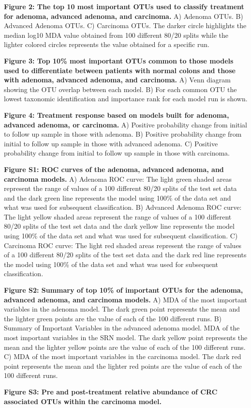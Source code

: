 \documentclass[12pt,]{article}
\begin{document}
\textbf{Figure 2: The top 10 most important OTUs used to classify
treatment for adenoma, advanced adenoma, and carcinoma.} A) Adenoma
OTUs. B) Advanced Adenoma OTUs. C) Carcinoma OTUs. The darker circle
highlights the median log10 MDA value obtained from 100 different 80/20
splits while the lighter colored circles represents the value obtained
for a specific run.

\textbf{Figure 3: Top 10\% most important OTUs common to those models
used to differentiate between patients with normal colons and those with
adenoma, advanced adenoma, and carcinoma.} A) Venn diagram showing the
OTU overlap between each model. B) For each common OTU the lowest
taxonomic identification and importance rank for each model run is
shown.

\textbf{Figure 4: Treatment response based on models built for adenoma,
advanced adenoma, or carcinoma.} A) Positive probability change from
initial to follow up sample in those with adenoma. B) Positive
probability change from initial to follow up sample in those with
advanced adenoma. C) Positive probability change from initial to follow
up sample in those with carcinoma.

\newpage

\textbf{Figure S1: ROC curves of the adenoma, advanced adenoma, and
carcinoma models.} A) Adenoma ROC curve: The light green shaded areas
represent the range of values of a 100 different 80/20 splits of the
test set data and the dark green line represents the model using 100\%
of the data set and what was used for subsequent classification. B)
Advanced Adenoma ROC curve: The light yellow shaded areas represent the
range of values of a 100 different 80/20 splits of the test set data and
the dark yellow line represents the model using 100\% of the data set
and what was used for subsequent classification. C) Carcinoma ROC curve:
The light red shaded areas represent the range of values of a 100
different 80/20 splits of the test set data and the dark red line
represents the model using 100\% of the data set and what was used for
subsequent classification.

\textbf{Figure S2: Summary of top 10\% of important OTUs for the
adenoma, advanced adenoma, and carcinoma models.} A) MDA of the most
important variables in the adenoma model. The dark green point
represents the mean and the lighter green points are the value of each
of the 100 different runs. B) Summary of Important Variables in the
advanced adenoma model. MDA of the most important variables in the SRN
model. The dark yellow point represents the mean and the lighter yellow
points are the value of each of the 100 different runs. C) MDA of the
most important variables in the carcinoma model. The dark red point
represents the mean and the lighter red points are the value of each of
the 100 different runs.

\textbf{Figure S3: Pre and post-treatment relative abundance of CRC
associated OTUs within the carcinoma model.}

\newpage
\end{document}
